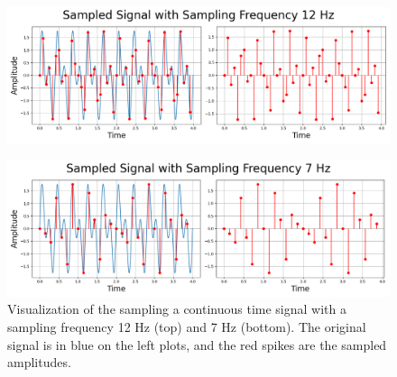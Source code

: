 \documentclass{article}
\begin{document}
\begin{figure}[H]
    \centering
    \begin{minipage}{0.8\textwidth}
        \centering
        \includegraphics[width=\linewidth]{images/new_sampled_12hz.png}
        \\[0.5em] 
    \end{minipage}
    
    \begin{minipage}{0.8\textwidth}
        \centering
        \includegraphics[width=\linewidth]{images/new_sampled_7hz.png}
    \end{minipage}
    
    \caption{Visualization of the sampling a continuous time signal with a sampling frequency 12 Hz (top) and 7 Hz (bottom). 
    The original signal is in blue on the left plots, and the red spikes are the sampled amplitudes.}
\end{figure}
    
    
\end{document}
